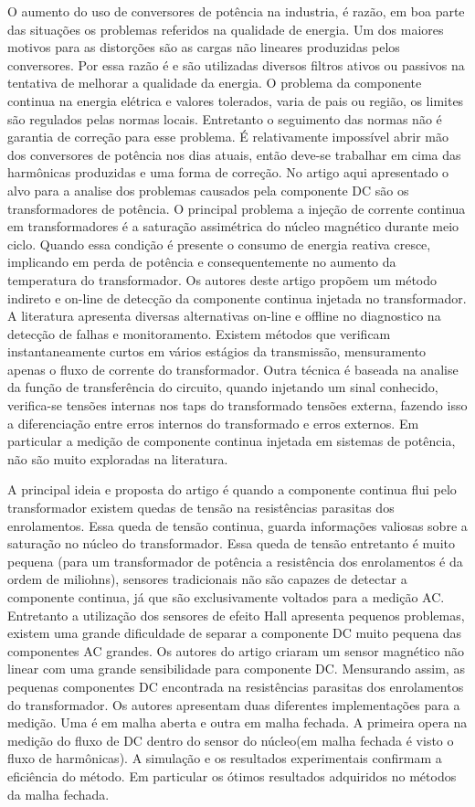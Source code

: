 \documentclass[paper=a4, fontsize=11pt]{article}
\begin{document}
O aumento do uso de conversores de potência na industria, é razão, em boa parte das 
situações os problemas referidos na qualidade de energia. Um dos maiores motivos 
para as distorções são as cargas não lineares produzidas pelos conversores. Por essa
razão é e são utilizadas diversos filtros ativos ou passivos na tentativa de melhorar
a qualidade da energia. O problema da componente continua na energia elétrica e 
valores tolerados, varia de pais ou região, os limites são regulados pelas normas 
locais. Entretanto o seguimento das normas não é garantia de correção para esse problema.
É relativamente impossível abrir mão dos conversores de potência nos dias atuais, 
então deve-se trabalhar em cima das harmônicas produzidas e uma forma de correção.
No artigo aqui apresentado o alvo para a analise dos problemas causados pela componente
DC são os transformadores de potência. O principal problema a injeção de corrente 
continua em transformadores é a saturação assimétrica do núcleo magnético durante 
meio ciclo. Quando essa condição é presente o consumo de energia reativa cresce, 
implicando em perda de potência e consequentemente no aumento da temperatura do
transformador. Os autores deste artigo propõem um método indireto e on-line 
de detecção da componente continua injetada no transformador. A literatura
apresenta diversas  alternativas on-line e offline no diagnostico na detecção 
de falhas e monitoramento. Existem métodos que verificam instantaneamente 
curtos em vários estágios da transmissão, mensuramento apenas o fluxo de 
corrente do transformador. Outra técnica é baseada na analise da função de transferência
do circuito, quando injetando um sinal conhecido, verifica-se tensões internas
nos taps do transformado tensões externa, fazendo isso a diferenciação entre
erros internos do transformado e erros externos. Em particular a medição de componente
continua injetada em sistemas de potência, não são muito exploradas na literatura.

A principal ideia e proposta do artigo é quando a componente continua flui pelo
transformador existem quedas de tensão na resistências parasitas dos enrolamentos.
Essa queda de tensão continua, guarda informações valiosas sobre a saturação
no núcleo do transformador. Essa queda de tensão entretanto é muito pequena (para um
transformador de potência a resistência dos enrolamentos é da ordem de miliohns), 
sensores tradicionais não são capazes de detectar a componente continua, já que 
são exclusivamente voltados para a medição AC. Entretanto a utilização dos sensores
de efeito Hall apresenta pequenos problemas, existem uma grande dificuldade de 
separar a componente DC muito pequena das componentes AC grandes. Os autores do 
artigo criaram um sensor magnético não linear com uma grande sensibilidade para
componente DC. Mensurando assim, as pequenas componentes DC encontrada na resistências
parasitas dos enrolamentos do transformador. Os autores apresentam duas diferentes
implementações para  a medição. Uma é em malha aberta e outra em malha fechada. 
A primeira opera na medição do fluxo de DC dentro do sensor do núcleo(em malha
fechada é visto o fluxo de harmônicas). A simulação e os resultados experimentais
confirmam a eficiência do método. Em particular os ótimos resultados adquiridos no 
métodos da malha fechada.
\end{document}
